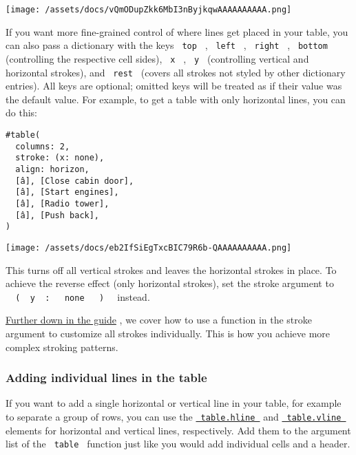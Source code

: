 \texttt{[image: /assets/docs/vQmODupZkk6MbI3nByjkqwAAAAAAAAAA.png]}

If you want more fine-grained control of where lines get placed in your
table, you can also pass a dictionary with the keys \texttt{\ top\ } ,
\texttt{\ left\ } , \texttt{\ right\ } , \texttt{\ bottom\ }
(controlling the respective cell sides), \texttt{\ x\ } , \texttt{\ y\ }
(controlling vertical and horizontal strokes), and \texttt{\ rest\ }
(covers all strokes not styled by other dictionary entries). All keys
are optional; omitted keys will be treated as if their value was the
default value. For example, to get a table with only horizontal lines,
you can do this:

\begin{verbatim}
#table(
  columns: 2,
  stroke: (x: none),
  align: horizon,
  [â], [Close cabin door],
  [â], [Start engines],
  [â], [Radio tower],
  [â], [Push back],
)
\end{verbatim}

\texttt{[image: /assets/docs/eb2IfSiEgTxcBIC79R6b-QAAAAAAAAAA.png]}

This turns off all vertical strokes and leaves the horizontal strokes in
place. To achieve the reverse effect (only horizontal strokes), set the
stroke argument to
\texttt{\ }{\texttt{\ (\ }}\texttt{\ y\ }{\texttt{\ :\ }}\texttt{\ }{\texttt{\ none\ }}\texttt{\ }{\texttt{\ )\ }}\texttt{\ }
instead.

\hyperref[stroke-functions]{Further down in the guide} , we cover how to
use a function in the stroke argument to customize all strokes
individually. This is how you achieve more complex stroking patterns.

\subsubsection{Adding individual lines in the
table}\label{individual-lines}

If you want to add a single horizontal or vertical line in your table,
for example to separate a group of rows, you can use the
\href{/docs/reference/model/table/\#definitions-hline}{\texttt{\ table.hline\ }}
and
\href{/docs/reference/model/table/\#definitions-vline}{\texttt{\ table.vline\ }}
elements for horizontal and vertical lines, respectively. Add them to
the argument list of the \texttt{\ table\ } function just like you would
add individual cells and a header.


